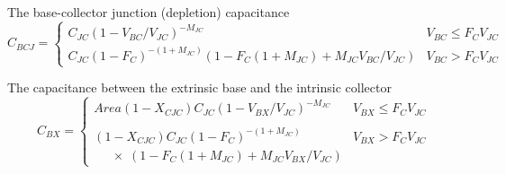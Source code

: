 \documentclass{article}
\begin{document}
The base-collector junction (depletion) capacitance
\begin{equation}
C_{BCJ} = \left\{ \! \! \begin{array}{ll}
C_{JC} \left(1-{{\textstyle V_{BC}}/{\textstyle V_{JC}}}\right)^{\textstyle -M_{JC}} & \! V_{BC} \le F_C V_{JC}\\
C_{JC} \left(1-F_C\right)^{\textstyle -(1+M_{JC})}\left(1-F_C(1+M_{JC})+M_{JC}{{\textstyle V_{BC}}/ {\textstyle V_{JC}}} \right) & \! V_{BC} > F_C V_{JC}
                       \end{array}
         \right.
\end{equation}



The capacitance between the extrinsic base and the intrinsic collector
\begin{equation}
C_{BX} = \left\{ \begin{array}{ll}
Area(1-X_{CJC}) C_{JC} \left(1-{{\textstyle V_{BX}} / {\textstyle V_{JC}}}\right)^{\textstyle -M_{JC}} & V_{BX} \le F_C V_{JC}\\ \\
(1-X_{CJC}) C_{JC} \left(1-F_C\right)^{\textstyle -(1+M_{JC})} & V_{BX} > F_C V_{JC}\\
\;\;\;\;\;\times\; \left(1-F_C(1+M_{JC})+M_{JC}{{\textstyle V_{BX}} / {\textstyle V_{JC}}} \right)  &
                \end{array}
        \right.
\end{equation}\\
\end{document}
